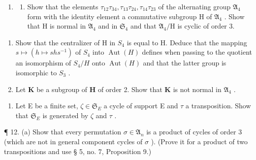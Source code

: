 \begin{enumerate}
\def\labelenumi{\arabic{enumi}.}
\setcounter{enumi}{9}
\tightlist
\item
  \begin{enumerate}
  \def\labelenumii{(\alph{enumii})}
  \tightlist
  \item
    Show that the elements \(\tau_{12}\tau_{34},\tau_{13}\tau_{24},\tau_{14}\tau_{23}\) of the alternating group \(\mathfrak{A}_4\) form with the identity element a commutative subgroup H of \(\mathfrak{A}_4\) . Show that H is normal in \(\mathfrak{A}_4\) and in \(\mathfrak{S}_4\) and that \(\mathfrak{A}_4 / \mathrm{H}\) is cyclic of order 3.
  \end{enumerate}
\end{enumerate}

\begin{enumerate}
\def\labelenumi{(\alph{enumi})}
\setcounter{enumi}{1}
\item
  Show that the centralizer of H in \(S_{4}\) is equal to H. Deduce that the mapping \(s \mapsto (h \mapsto shs^{-1})\) of \(S_{4}\) into \(\operatorname{Aut}(H)\) defines when passing to the quotient an isomorphism of \(S_{4}/H\) onto \(\operatorname{Aut}(H)\) and that the latter group is isomorphic to \(S_{3}\) .
\item
  Let \(\mathbf{K}\) be a subgroup of \(\mathbf{H}\) of order 2. Show that \(\mathbf{K}\) is not normal in \(\mathfrak{A}_4\) .
\end{enumerate}

\begin{enumerate}
\def\labelenumi{\arabic{enumi}.}
\setcounter{enumi}{10}
\tightlist
\item
  Let E be a finite set, \(\zeta \in \mathfrak{S}_{E}\) a cycle of support E and \(\tau\) a transposition. Show that \(\mathfrak{S}_{E}\) is generated by \(\zeta\) and \(\tau\) .
\end{enumerate}

¶ 12. (a) Show that every permutation \(\sigma \in \mathfrak{A}_n\) is a product of cycles of order 3 (which are not in general component cycles of \(\sigma\) ). (Prove it for a product of two transpositions and use § 5, no. 7, Proposition 9.)

